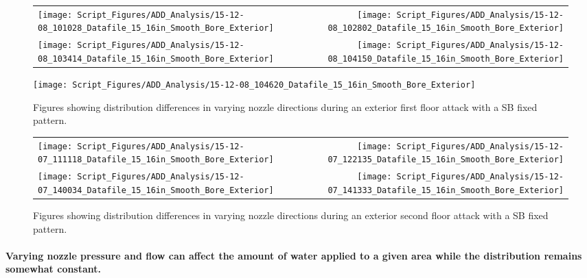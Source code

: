 \documentclass{article}
\begin{document}
\begin{figure}[ht]
\begin{tabular*}{\textwidth}{lr}
\texttt{[image: Script\_Figures/ADD\_Analysis/15-12-08\_101028\_Datafile\_15\_16in\_Smooth\_Bore\_Exterior]} &
\texttt{[image: Script\_Figures/ADD\_Analysis/15-12-08\_102802\_Datafile\_15\_16in\_Smooth\_Bore\_Exterior]} \\
\texttt{[image: Script\_Figures/ADD\_Analysis/15-12-08\_103414\_Datafile\_15\_16in\_Smooth\_Bore\_Exterior]} &
\texttt{[image: Script\_Figures/ADD\_Analysis/15-12-08\_104150\_Datafile\_15\_16in\_Smooth\_Bore\_Exterior]} \\
\end{tabular*}
\centering
\texttt{[image: Script\_Figures/ADD\_Analysis/15-12-08\_104620\_Datafile\_15\_16in\_Smooth\_Bore\_Exterior]} \\
\caption{Figures showing distribution differences in varying nozzle directions during an exterior first floor attack with a SB fixed pattern.}
\label{fig:Exterior_First_Floor_Varying_Nozzle_Directions_SB_Fixed_Pattern}
\end{figure}

\clearpage

\begin{figure}[ht]
\begin{tabular*}{\textwidth}{lr}
\texttt{[image: Script\_Figures/ADD\_Analysis/15-12-07\_111118\_Datafile\_15\_16in\_Smooth\_Bore\_Exterior]} &
\texttt{[image: Script\_Figures/ADD\_Analysis/15-12-07\_122135\_Datafile\_15\_16in\_Smooth\_Bore\_Exterior]} \\
\texttt{[image: Script\_Figures/ADD\_Analysis/15-12-07\_140034\_Datafile\_15\_16in\_Smooth\_Bore\_Exterior]} &
\texttt{[image: Script\_Figures/ADD\_Analysis/15-12-07\_141333\_Datafile\_15\_16in\_Smooth\_Bore\_Exterior]} \\
\end{tabular*}
\caption{Figures showing distribution differences in varying nozzle directions during an exterior second floor attack with a SB fixed pattern.}
\label{fig:Exterior_Second_Floor_Varying_Nozzle_Directions_SB_Fixed_Pattern}
\end{figure}

\clearpage

\paragraph{Varying nozzle pressure and flow can affect the amount of water applied to a given area while the distribution remains somewhat constant.} \mbox{}
\end{document}
